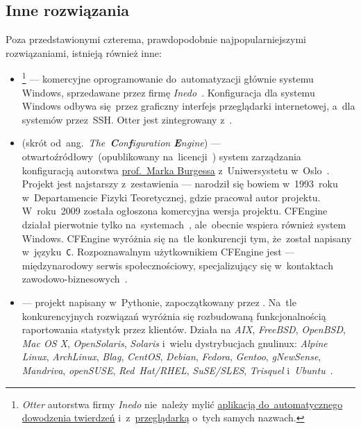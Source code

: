 \documentclass[thesis]{subfiles}
\begin{document}

\subsection{Inne rozwiązania}

Poza przedstawionymi czterema, prawdopodobnie najpopularniejszymi rozwiązaniami, istnieją również inne:
\begin{itemize}
	\item {}\footnote{\emph{Otter} autorstwa firmy \emph{Inedo} nie~należy mylić \href{https://en.wikipedia.org/wiki/Prover9\#Predecessor}{aplikacją do~automatycznego dowodzenia twierdzeń} i~z~\href{https://pl.wikipedia.org/wiki/Otter\_Browser}{przeglądarką} o~tych samych nazwach.} --- komercyjne oprogramowanie do~automatyzacji głównie systemu Windows, sprzedawane przez firmę \emph{Inedo}~\cite{otter}. Konfiguracja dla systemu Windows odbywa się~przez graficzny interfejs przeglądarki internetowej, a~dla systemów  przez~SSH. Otter jest zintegrowany z~.
	\item {} (skrót od~ang.~\emph{The~\textbf{C}on\textbf{f}iguration \textbf{E}ngine}) --- otwartoźródłowy~(opublikowany na~licencji~) system zarządzania konfiguracją autorstwa \href{https://en.wikipedia.org/wiki/Mark_Burgess_(computer_scientist)}{prof.~Marka Burgessa} z~Uniwersystetu w~Oslo~\cite{cfengine}. Projekt jest najstarszy z~zestawienia --- narodził się bowiem w~1993~roku w~Departamencie Fizyki Teoretycznej, gdzie pracował autor projektu. W~roku~2009 została ogłoszona komercyjna wersja projektu. CFEngine działał pierwotnie tylko na~systemach~, ale~obecnie wspiera również system Windows. CFEngine wyróżnia się na~tle konkurencji tym, że~został napisany w~języku~\texttt{C}. Rozpoznawalnym użytkownikiem CFEngine jest  --- międzynarodowy serwis społecznościowy, specjalizujący się w~kontaktach zawodowo-biznesowych~\cite{cfengine-linkedin}.
	\item {} --- projekt napisany w~Pythonie, zapoczątkowany przez . Na~tle konkurencyjnych rozwiązań wyróżnia się rozbudowaną funkcjonalnością raportowania statystyk przez klientów. Działa na \emph{AIX}, \emph{FreeBSD}, \emph{OpenBSD}, \emph{Mac OS X}, \emph{OpenSolaris}, \emph{Solaris} i~wielu dystrybucjach \gls{gnulinux}: \emph{Alpine Linux}, \emph{ArchLinux}, \emph{Blag}, \emph{CentOS}, \emph{Debian}, \emph{Fedora}, \emph{Gentoo}, \emph{gNewSense}, \emph{Mandriva}, \emph{openSUSE}, \emph{Red~Hat/RHEL}, \emph{SuSE/SLES}, \emph{Trisquel} i~\emph{Ubuntu}~\cite{bcfg2}.
\end{itemize}
\end{document}
